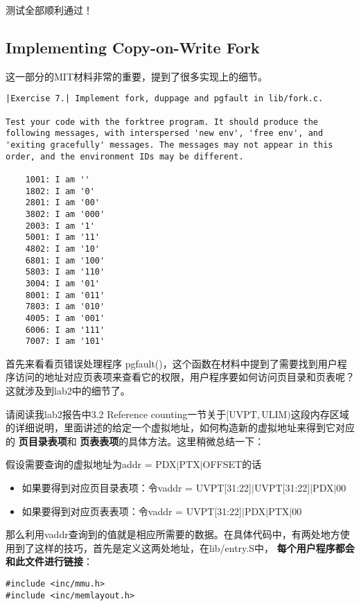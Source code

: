 \documentclass{article}
\newcommand{\highlight}[1]{{\bfseries \color{red}  #1}}
\newcommand{\funcname}[1]{{\ttfamily \small #1}}
\begin{document}
\begin{CJK*}{UTF8}{gkai}
测试全部顺利通过！

\subsection{Implementing Copy-on-Write Fork}

这一部分的MIT材料非常的重要，提到了很多实现上的细节。

\begin{lstlisting}[style=exercise]
|Exercise 7.| Implement fork, duppage and pgfault in lib/fork.c.

Test your code with the forktree program. It should produce the following messages, with interspersed 'new env', 'free env', and 'exiting gracefully' messages. The messages may not appear in this order, and the environment IDs may be different.

	1001: I am ''
	1802: I am '0'
	2801: I am '00'
	3802: I am '000'
	2003: I am '1'
	5001: I am '11'
	4802: I am '10'
	6801: I am '100'
	5803: I am '110'
	3004: I am '01'
	8001: I am '011'
	7803: I am '010'
	4005: I am '001'
	6006: I am '111'
	7007: I am '101'
\end{lstlisting}

\vspace{2em}

首先来看看页错误处理程序 \funcname{pgfault()}，这个函数在材料中提到了需要找到用户程序访问的地址对应页表项来查看它的权限，用户程序要如何访问页目录和页表呢？这就涉及到lab2中的细节了。

请阅读我lab2报告中3.2 Reference counting一节关于$[\mathrm{UVPT}, \mathrm{ULIM})$这段内存区域的详细说明，里面讲述的给定一个虚拟地址，如何构造新的虚拟地址来得到它对应的\highlight{页目录表项}和\highlight{页表表项}的具体方法。这里稍微总结一下：

假设需要查询的虚拟地址为addr = PDX$\left|\right.$PTX$\left|\right.$OFFSET的话
\begin{itemize}
\item{如果要得到对应页目录表项：令vaddr = UVPT[31:22]$\left|\right.$UVPT[31:22]$\left|\right.$PDX$\left|\right.$00}
\item{如果要得到对应页表表项：令vaddr = UVPT[31:22]$\left|\right.$PDX$\left|\right.$PTX$\left|\right.$00}
\end{itemize}

那么利用vaddr查询到的值就是相应所需要的数据。在具体代码中，有两处地方使用到了这样的技巧，首先是定义这两处地址，在lib/entry.S中，\highlight{每个用户程序都会和此文件进行链接}：

\begin{lstlisting}[style=acode, title={\scriptsize \ttfamily \bfseries lib/entry.S}]
#include <inc/mmu.h>
#include <inc/memlayout.h>


\end{lstlisting}
\end{CJK*}
\end{document}
